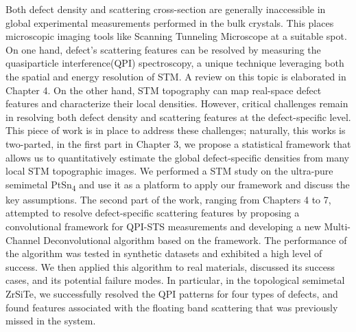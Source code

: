 Both defect density and scattering cross-section are generally inaccessible in global experimental measurements performed in the bulk crystals. This places microscopic imaging tools like Scanning Tunneling Microscope at a suitable spot. On one hand, defect's scattering features can be resolved by measuring the quasiparticle interference(QPI) spectroscopy, a unique technique leveraging both the spatial and energy resolution of \ac{STM}. A review on this topic is elaborated in Chapter 4. On the other hand, \ac{STM} topography can map real-space defect features and characterize their local densities. However, critical challenges remain in resolving both defect density and scattering features at the defect-specific level. This piece of work is in place to address these challenges; naturally, this works is two-parted, in the first part in Chapter 3, we propose a statistical framework that allows us to quantitatively estimate the global defect-specific densities from many local \ac{STM} topographic images. We performed a \ac{STM} study on the ultra-pure semimetal PtSn\textsubscript{4} and use it as a platform to apply our framework and discuss the key assumptions. The second part of the work, ranging from Chapters 4 to 7, attempted to resolve defect-specific scattering features by proposing a convolutional framework for QPI-STS measurements and developing a new Multi-Channel Deconvolutional algorithm based on the framework. The performance of the algorithm was tested in synthetic datasets and exhibited a high level of success. We then applied this algorithm to real materials, discussed its success cases, and its potential failure modes. In particular, in the topological semimetal ZrSiTe, we successfully resolved the \ac{QPI} patterns for four types of defects, and found features associated with the floating band scattering that was previously missed in the system\cite{stuartQuasiparticleInterferenceObservation2022}.  